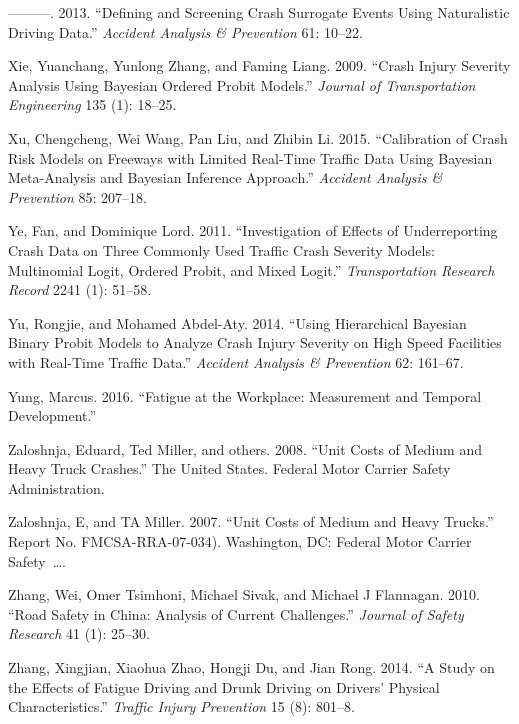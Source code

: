 \documentclass[12pt]{book}
\numberwithin{equation}{chapter}
\begin{document}
\leavevmode\hypertarget{ref-wu2013defining}{}%
---------. 2013. ``Defining and Screening Crash Surrogate Events Using Naturalistic Driving Data.'' \emph{Accident Analysis \& Prevention} 61: 10--22.

\leavevmode\hypertarget{ref-xie2009crash}{}%
Xie, Yuanchang, Yunlong Zhang, and Faming Liang. 2009. ``Crash Injury Severity Analysis Using Bayesian Ordered Probit Models.'' \emph{Journal of Transportation Engineering} 135 (1): 18--25.

\leavevmode\hypertarget{ref-xu2015calibration}{}%
Xu, Chengcheng, Wei Wang, Pan Liu, and Zhibin Li. 2015. ``Calibration of Crash Risk Models on Freeways with Limited Real-Time Traffic Data Using Bayesian Meta-Analysis and Bayesian Inference Approach.'' \emph{Accident Analysis \& Prevention} 85: 207--18.

\leavevmode\hypertarget{ref-ye2011investigation}{}%
Ye, Fan, and Dominique Lord. 2011. ``Investigation of Effects of Underreporting Crash Data on Three Commonly Used Traffic Crash Severity Models: Multinomial Logit, Ordered Probit, and Mixed Logit.'' \emph{Transportation Research Record} 2241 (1): 51--58.

\leavevmode\hypertarget{ref-yu2014using}{}%
Yu, Rongjie, and Mohamed Abdel-Aty. 2014. ``Using Hierarchical Bayesian Binary Probit Models to Analyze Crash Injury Severity on High Speed Facilities with Real-Time Traffic Data.'' \emph{Accident Analysis \& Prevention} 62: 161--67.

\leavevmode\hypertarget{ref-yung2016fatigue}{}%
Yung, Marcus. 2016. ``Fatigue at the Workplace: Measurement and Temporal Development.''

\leavevmode\hypertarget{ref-zaloshnja2008unit}{}%
Zaloshnja, Eduard, Ted Miller, and others. 2008. ``Unit Costs of Medium and Heavy Truck Crashes.'' The United States. Federal Motor Carrier Safety Administration.

\leavevmode\hypertarget{ref-zaloshnja2007unit}{}%
Zaloshnja, E, and TA Miller. 2007. ``Unit Costs of Medium and Heavy Trucks.'' Report No. FMCSA-RRA-07-034). Washington, DC: Federal Motor Carrier Safety~\ldots{}.

\leavevmode\hypertarget{ref-zhang2010road}{}%
Zhang, Wei, Omer Tsimhoni, Michael Sivak, and Michael J Flannagan. 2010. ``Road Safety in China: Analysis of Current Challenges.'' \emph{Journal of Safety Research} 41 (1): 25--30.

\leavevmode\hypertarget{ref-zhang2014study}{}%
Zhang, Xingjian, Xiaohua Zhao, Hongji Du, and Jian Rong. 2014. ``A Study on the Effects of Fatigue Driving and Drunk Driving on Drivers' Physical Characteristics.'' \emph{Traffic Injury Prevention} 15 (8): 801--8.
\end{document}
